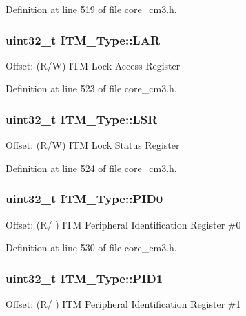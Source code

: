 \-Definition at line 519 of file core\-\_\-cm3.\-h.

\hypertarget{struct_i_t_m___type_a33025af19748bd3ca5cf9d6b14150001}{
\subsubsection[{\-L\-A\-R}]{ uint32\-\_\-t {\bf \-I\-T\-M\-\_\-\-Type\-::\-L\-A\-R}}}\label{struct_i_t_m___type_a33025af19748bd3ca5cf9d6b14150001}
\-Offset\-: (\-R/\-W) \-I\-T\-M \-Lock \-Access \-Register 

\-Definition at line 523 of file core\-\_\-cm3.\-h.

\hypertarget{struct_i_t_m___type_a56f607260c4175c5f37a28e47ab3d1e5}{
\subsubsection[{\-L\-S\-R}]{ uint32\-\_\-t {\bf \-I\-T\-M\-\_\-\-Type\-::\-L\-S\-R}}}\label{struct_i_t_m___type_a56f607260c4175c5f37a28e47ab3d1e5}
\-Offset\-: (\-R/\-W) \-I\-T\-M \-Lock \-Status \-Register 

\-Definition at line 524 of file core\-\_\-cm3.\-h.

\hypertarget{struct_i_t_m___type_ab69ade751350a7758affdfe396517535}{
\subsubsection[{\-P\-I\-D0}]{ uint32\-\_\-t {\bf \-I\-T\-M\-\_\-\-Type\-::\-P\-I\-D0}}}\label{struct_i_t_m___type_ab69ade751350a7758affdfe396517535}
\-Offset\-: (\-R/ ) \-I\-T\-M \-Peripheral \-Identification \-Register \#0 

\-Definition at line 530 of file core\-\_\-cm3.\-h.

\hypertarget{struct_i_t_m___type_a30e87ec6f93ecc9fe4f135ca8b068990}{
\subsubsection[{\-P\-I\-D1}]{ uint32\-\_\-t {\bf \-I\-T\-M\-\_\-\-Type\-::\-P\-I\-D1}}}\label{struct_i_t_m___type_a30e87ec6f93ecc9fe4f135ca8b068990}
\-Offset\-: (\-R/ ) \-I\-T\-M \-Peripheral \-Identification \-Register \#1 

